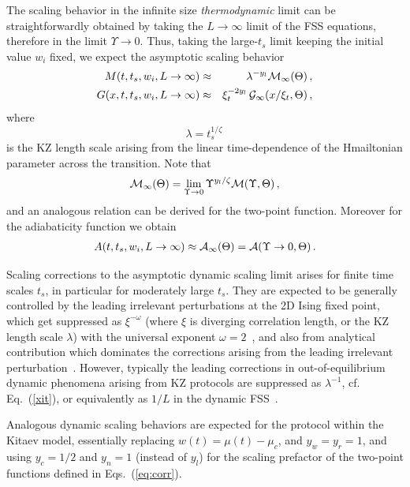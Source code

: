 The scaling behavior in the infinite size {\em thermodynamic} limit
can be straightforwardly obtained by taking the $L\to\infty$ limit of
the FSS equations, therefore in the limit $\Upsilon\to 0$.  Thus,
taking the large-$t_s$ limit keeping the initial value $w_i$ fixed, we
expect the asymptotic scaling behavior
\begin{eqnarray}
  M(t,t_s,w_i,L\to\infty) &\approx&
  \lambda^{-y_l} {\cal M}_\infty(\Theta)\,,
  \label{magsca3}\\
    G(x,t,t_s,w_i,L\to\infty) &\approx& \xi_t^{-2y_l}\, {\cal
      G}_\infty(x/\xi_t,\Theta)\,,
  \label{G2sca3}
\end{eqnarray}
where
\begin{equation}
  \lambda = t_s^{1/\zeta} \,
  \label{xit}
\end{equation}
is the KZ length scale arising from the linear time-dependence of the
Hmailtonian parameter across the transition.  Note that
\begin{eqnarray}
  {\cal M}_\infty(\Theta) = \lim_{\Upsilon\to 0}
  \Upsilon^{y_l/\zeta} {\cal M}(\Upsilon,\Theta)\,,
  \label{minftyrel}
\end{eqnarray}
and an analogous relation can be derived for the two-point function.
Moreover for the adiabaticity function we obtain
\begin{eqnarray}
  A(t,t_s,w_i,L\to\infty) \approx {\cal A}_\infty(\Theta) =
  {\cal A}(\Upsilon\to 0,\Theta)\,.
\label{wsca3}
\end{eqnarray}


Scaling corrections to the asymptotic dynamic scaling limit arises for
finite time scales $t_s$, in particular for moderately large $t_s$.
They are expected to be generally controlled by the leading irrelevant
perturbations at the 2D Ising fixed point, which get suppressed as
$\xi^{-\omega}$ (where $\xi$ is diverging correlation length, or the
KZ length scale $\lambda$) with the universal exponent
$\omega=2$~\cite{CHPV-02,CCCPV-00,CV2014}, and also from
analytical contribution which dominates the corrections arising from
the leading irrelevant perturbation~\cite{PV2002,rossini2021coherent}. However,
typically the leading corrections in out-of-equilibrium dynamic
phenomena arising from KZ protocols are suppressed as $\lambda^{-1}$,
cf. Eq.~(\ref{xit}), or equivalently as $1/L$ in the dynamic
FSS~\cite{rossini2021coherent}.


Analogous dynamic scaling behaviors are expected for the protocol
within the Kitaev model, essentially replacing $w(t) = \mu(t)-\mu_c$,
and $y_w = y_r = 1$, and using $y_c=1/2$ and $y_n=1$ (instead of
$y_l$) for the scaling prefactor of the two-point functions defined in
Eqs.~(\ref{eq:corr}).


